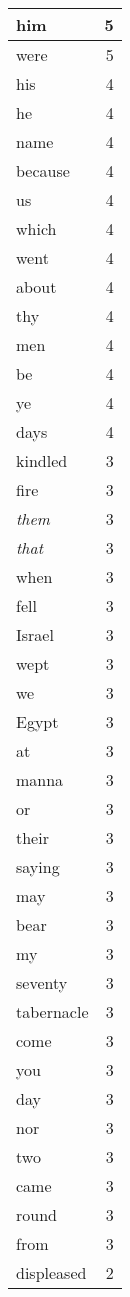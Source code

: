\begin{center}
\begin{longtable}{l|r}
him & 5 \\ \hline
were & 5 \\ \hline
his & 4 \\ \hline
he & 4 \\ \hline
name & 4 \\ \hline
because & 4 \\ \hline
us & 4 \\ \hline
which & 4 \\ \hline
went & 4 \\ \hline
about & 4 \\ \hline
thy & 4 \\ \hline
men & 4 \\ \hline
be & 4 \\ \hline
ye & 4 \\ \hline
days & 4 \\ \hline
kindled & 3 \\ \hline
fire & 3 \\ \hline
\emph{them} & 3 \\ \hline
\emph{that} & 3 \\ \hline
when & 3 \\ \hline
fell & 3 \\ \hline
Israel & 3 \\ \hline
wept & 3 \\ \hline
we & 3 \\ \hline
Egypt & 3 \\ \hline
at & 3 \\ \hline
manna & 3 \\ \hline
or & 3 \\ \hline
their & 3 \\ \hline
saying & 3 \\ \hline
may & 3 \\ \hline
bear & 3 \\ \hline
my & 3 \\ \hline
seventy & 3 \\ \hline
tabernacle & 3 \\ \hline
come & 3 \\ \hline
you & 3 \\ \hline
day & 3 \\ \hline
nor & 3 \\ \hline
two & 3 \\ \hline
came & 3 \\ \hline
round & 3 \\ \hline
from & 3 \\ \hline
displeased & 2 \\ \hline

\end{longtable}
\end{center}
